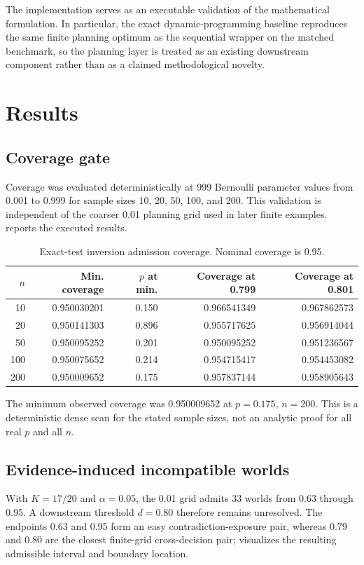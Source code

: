 \documentclass[11pt]{article}
\begin{document}
The implementation serves as an executable validation of the mathematical formulation. In particular, the exact dynamic-programming baseline reproduces the same finite planning optimum as the sequential wrapper on the matched benchmark, so the planning layer is treated as an existing downstream component rather than as a claimed methodological novelty.

\section{Results}
\subsection{Coverage gate}
Coverage was evaluated deterministically at 999 Bernoulli parameter values from 0.001 to 0.999 for sample sizes 10, 20, 50, 100, and 200. This validation is independent of the coarser 0.01 planning grid used in later finite examples.  reports the executed results.

\begin{table}[H]
\centering
\caption{Exact-test inversion admission coverage. Nominal coverage is 0.95.}
\label{tab:coverage}
\begin{tabular}{rrrrr}
\toprule
$n$ & Min. coverage & $p$ at min. & Coverage at 0.799 & Coverage at 0.801\\
\midrule
10  & 0.950030201 & 0.150 & 0.966541349 & 0.967862573\\
20  & 0.950141303 & 0.896 & 0.955717625 & 0.956914044\\
50  & 0.950095252 & 0.201 & 0.950095252 & 0.951236567\\
100 & 0.950075652 & 0.214 & 0.954715417 & 0.954453082\\
200 & 0.950009652 & 0.175 & 0.957837144 & 0.958905643\\
\bottomrule
\end{tabular}
\end{table}

The minimum observed coverage was 0.950009652 at $p=0.175$, $n=200$. This is a deterministic dense scan for the stated sample sizes, not an analytic proof for all real $p$ and all $n$.

\subsection{Evidence-induced incompatible worlds}
With $K=17/20$ and $\alpha=0.05$, the 0.01 grid admits 33 worlds from 0.63 through 0.95. A downstream threshold $d=0.80$ therefore remains unresolved. The endpoints 0.63 and 0.95 form an easy contradiction-exposure pair, whereas 0.79 and 0.80 are the closest finite-grid cross-decision pair;  visualizes the resulting admissible interval and boundary location.
\end{document}
